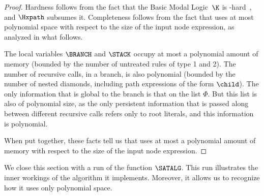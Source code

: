 \documentclass[10pt,a4paper]{amsart}
\theoremstyle{definition}
\theoremstyle{remark}
\begin{document}
\begin{proof}
    Hardness follows from the fact that the Basic Modal Logic~$\K$ is \pspace-hard~\cite{blackburn2001modal,blackburn06}, and $\Hxpath$ subsumes it. 
    Completeness follows from the fact that  uses at most polynomial space with respect to the size of the input node expression, as analyzed in what follows. 

    The local variables $\BRANCH$ and $\STACK$ occupy at most a polynomial amount of memory (bounded by the number of untreated rules of type 1 and 2).
    The number of recursive calls, in a branch, is also polynomial (bounded by the number of nested diamonds, including path expressions of the form $\child$). 
    The only information that is global to the branch is that on the list $\Phi$.
    But this list is also of polynomial size, as the only persistent information that is passed along between different recursive calls refers only to root literals, and this information is polynomial.

    When put together, these facts tell us that  uses at most a polynomial amount of memory with respect to the size of the input node expression.
\end{proof}



We close this section with a run of the function $\SATALG$.
This run illustrates the inner workings of the algorithm it implements.
Moreover, it allows us to recognize how it uses only polynomial space.
\end{document}
